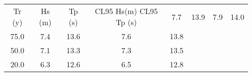 \begin{tabular}{ccccc}
Tr (y)& Hs (m)& Tp (s)& CL95 Hs(m) CL95 Tp (s)  & 7.7 & 13.9 & 7.9 & 14.0 \\
75.0 & 7.4 & 13.6 & 7.6 & 13.8 \\
50.0 & 7.1 & 13.3 & 7.3 & 13.5 \\
20.0 & 6.3 & 12.6 & 6.5 & 12.8 \\
\hline
\end{tabular}
